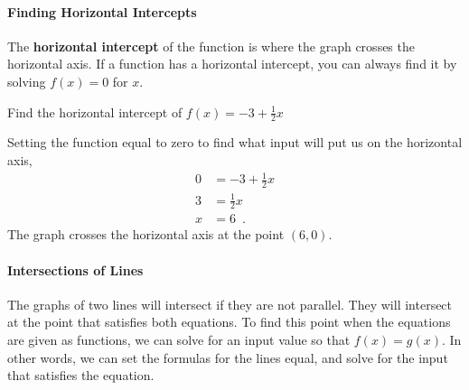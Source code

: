 \paragraph*{Finding Horizontal Intercepts}

\begin{definition}
  The \textbf{horizontal intercept} of the function is where the graph crosses the horizontal axis. If a function has a horizontal intercept, you can always find it by solving $f(x) = 0$ for $x$.
\end{definition}

\begin{example}
Find the horizontal intercept of $f(x) = -3 + \frac{1}{2} x$

\begin{solution} Setting the function equal to zero to find what input will put us on the
horizontal axis,
\begin{align*}
  0 &= -3 + \frac{1}{2}x \\
  3 &= \frac{1}{2}x\\
  x &= 6\enspace .
\end{align*}
The graph crosses the horizontal axis at the point $(6,0)$.
\end{solution}\end{example}

\paragraph{Intersections of Lines}

The graphs of two lines will intersect if they are not parallel. They will intersect at the point that satisfies both equations. To find this point when the equations are given as functions, we can solve for an input value so that $f(x)=g(x)$. In other words, we can set the formulas for the lines equal, and solve for the input that satisfies the equation.

